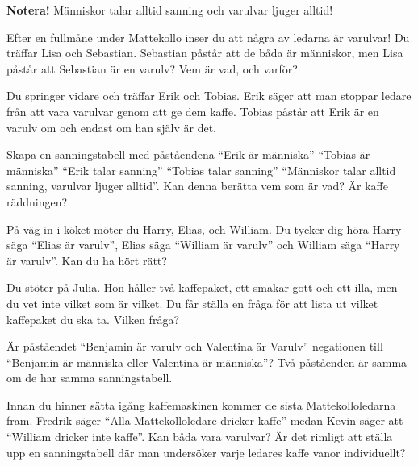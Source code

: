 \noindent
\textbf{Notera!}  Människor talar alltid sanning och varulvar ljuger alltid!

\begin{problem}
	Efter en fullmåne under Mattekollo inser du att några av ledarna är varulvar! Du träffar Lisa och Sebastian. Sebastian påstår att de båda är människor, men Lisa påstår att Sebastian är en varulv? Vem är vad, och varför?
\end{problem}

\begin{problem}
	Du springer vidare och träffar Erik och Tobias. Erik säger att man stoppar ledare från att vara varulvar genom att ge dem kaffe. Tobias påstår att Erik är en varulv om och endast om han själv är det.

	Skapa en sanningstabell med påståendena ``Erik är människa'' ``Tobias är människa'' ``Erik talar sanning'' ``Tobias talar sanning'' ``Människor talar alltid sanning, varulvar ljuger alltid''. Kan denna berätta vem som är vad? Är kaffe räddningen?
\end{problem}

\begin{problem}
	På väg in i köket möter du Harry, Elias, och William. Du tycker dig höra Harry säga ``Elias är varulv'', Elias säga ``William är varulv'' och William säga ``Harry är varulv''. Kan du ha hört rätt?
\end{problem}

\begin{problem}[Extra]
	Du stöter på Julia. Hon håller två kaffepaket, ett smakar gott och ett illa, men du vet inte vilket som är vilket. Du får ställa en fråga för att lista ut vilket kaffepaket du ska ta. Vilken fråga?
\end{problem}

\begin{problem}
	Är påståendet ``Benjamin är varulv och Valentina är Varulv'' negationen till ``Benjamin är människa eller Valentina är människa''? Två påståenden är samma om de har samma sanningstabell.
\end{problem}

\begin{problem}
	Innan du hinner sätta igång kaffemaskinen kommer de sista Mattekolloledarna fram. Fredrik säger ``Alla Mattekolloledare dricker kaffe'' medan Kevin säger att ``William dricker inte kaffe''. Kan båda vara varulvar? Är det rimligt att ställa upp en sanningstabell där man undersöker varje ledares kaffe vanor individuellt?
\end{problem}
